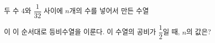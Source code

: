 두 수 $4$와 $\dfrac{1}{32}$ 사이에 $n$개의 수를 넣어서 만든 수열\par\smallskip{}\par\smallskip\noindent 이 이 순서대로 등비수열을 이룬다. 이 수열의 공비가 $\dfrac{1}{2}$일 때, $n$의 값은?

